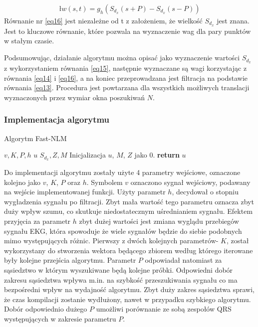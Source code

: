 \documentclass[a4paper]{article}
\begin{document}
\begin{equation}\label{eq16}
\begin{split}ł
w(s,t) = g_{h}(S_{d_{x}}(s+P)-S_{d_{x}}(s-P))
\end{split}
\end{equation}
Równanie nr \ref{eq16} jest niezależne od t z założeniem, że wielkość $S_{d_{x}}$ jest znana. Jest to kluczowe równanie, które pozwala na wyznaczenie wag dla pary punktów w stałym czasie. 

Podsumowując, działanie algorytmu można opisać jako  wyznaczenie wartości $S_{d_{x}}$ z wykorzystaniem równania \ref{eq15}, następnie wyznaczane są wagi korzystając z równania \ref{eq14} i \ref{eq16}, a na koniec przeprowadzana jest filtracja na podstawie równania \ref{eq13}. Procedura jest powtarzana dla wszystkich możliwych translacji wyznaczonych przez wymiar okna poszukiwań $N$\cite{darbon}\cite{tracey}.
 
\subsubsection{Implementacja algorytmu}

\begin{algorithm}
\caption{Algorytm Fast-NLM }
\begin{algorithmic}[1]
\Input $v,K,P,h$
\Output $u$
\Temporary $S_{d_{x}}, Z, M$
\State Inicjalizacja $u$, $M$, $Z$ jako $0$.
\EndFor
\EndFor
{}
\EndFor
\State \textbf{return} $u$
\end{algorithmic}
\end{algorithm}

Do implementacji algorytmu zostały użyte 4 parametry wejściowe, oznaczone kolejno jako $v$, $K$, $P$ oraz $h$. Symbolem $v$ oznaczono sygnał wejściowy, podawany na wejście implementowanej funkcji. Użyty  parametr $h$, decydował o stopniu wygładzenia sygnału po filtracji. Zbyt mała wartość tego parametru oznacza zbyt duży wpływ szumu, co skutkuje niedostatecznym uśrednianiem sygnału. Efektem przyjęcia za parametr $h$ zbyt dużej wartości jest zmiana wyglądu przebiegów sygnału EKG, która spowoduje że wiele sygnałów będzie do siebie podobnych mimo występujących różnic. Pierwszy z dwóch kolejnych parametrów- $K$, został wykorzystany do stworzenia wektora będącego zbiorem według którego iterowane były kolejne przejścia algorytmu. Parametr $P$ odpowiadał natomiast za sąsiedztwo w którym wyszukiwane będą kolejne próbki. Odpowiedni dobór zakresu sąsiedztwa wpływa m.in. na szybkość przeszukiwania sygnału co ma bezpośredni wpływ na wydajność algorytmu. Zbyt duży zakres sąsiedztwa sprawi, że czas kompilacji zostanie wydłużony, nawet w przypadku szybkiego algorytmu. Dobór odpowiednio dużego $P$ umożliwi porównanie ze sobą zespołów QRS występujących w zakresie parametru $P$\cite{tracey}.
\end{document}
